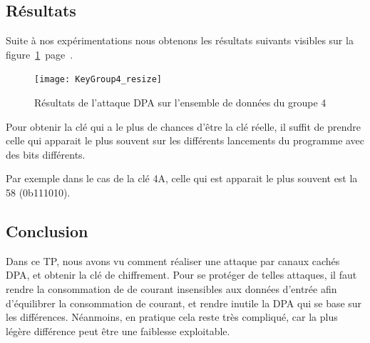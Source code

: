 \subsection{Résultats}

Suite à nos expérimentations nous obtenons les résultats suivants visibles
sur la figure~\ref{fig:resultsDPA}~page~\pageref{fig:resultsDPA}.

\begin{figure}[h!]
\centering
	\texttt{[image: KeyGroup4\_resize]}
	\caption{Résultats de l'attaque DPA sur l'ensemble de données du groupe 4}
	\label{fig:resultsDPA}
\end{figure}

Pour obtenir la clé qui a le plus de chances d'être la clé réelle, il suffit
de prendre celle qui apparait le plus souvent sur les différents lancements
du programme avec des bits différents.

Par exemple dans le cas de la clé 4A, celle qui est apparait le plus souvent est
la 58 (0b111010).

\subsection{Conclusion}

Dans ce TP, nous avons vu comment réaliser une attaque par canaux cachés DPA, et
obtenir la clé de chiffrement. Pour se protéger de telles attaques, il faut
rendre la consommation de de courant insensibles aux données d'entrée afin
d'équilibrer la consommation de courant, et rendre inutile la DPA qui se base
sur les différences. Néanmoins, en pratique cela reste très compliqué, car la
plus légère différence peut être une faiblesse exploitable.
